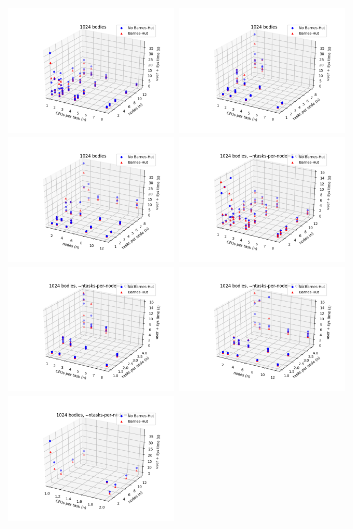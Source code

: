 \documentclass[11pt,a4paper]{article}
\begin{document}
\includegraphics[width=4.4cm]{1024-cpusPerTask-nodes}
\includegraphics[width=4.4cm]{1024-cpusPerTask-tasksPerNode}
\includegraphics[width=4.4cm]{1024-nodes-tasksPerNode}
\includegraphics[width=4.4cm]{1024-cpusPerTask-nodes-elide_8_tpn}
\includegraphics[width=4.4cm]{1024-cpusPerTask-tasksPerNode-elide_8_tpn}
\includegraphics[width=4.4cm]{1024-nodes-tasksPerNode-elide_8_tpn}
\includegraphics[width=4.4cm]{1024-cpusPerTask-nodes-just_1_tpn}
\end{document}
